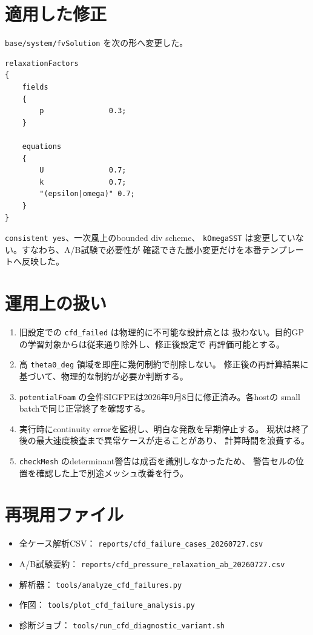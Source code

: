 \documentclass[a4paper,11pt]{article}
\begin{document}
\section{適用した修正}

\texttt{base/system/fvSolution} を次の形へ変更した。

\begin{verbatim}
relaxationFactors
{
    fields
    {
        p               0.3;
    }

    equations
    {
        U               0.7;
        k               0.7;
        "(epsilon|omega)" 0.7;
    }
}
\end{verbatim}

\texttt{consistent yes}、一次風上のbounded div scheme、
\texttt{kOmegaSST} は変更していない。すなわち、A/B試験で必要性が
確認できた最小変更だけを本番テンプレートへ反映した。

\section{運用上の扱い}

\begin{enumerate}[leftmargin=24pt]
  \item 旧設定での \texttt{cfd\_failed} は物理的に不可能な設計点とは
    扱わない。目的GPの学習対象からは従来通り除外し、修正後設定で
    再評価可能とする。
  \item 高 \texttt{theta0\_deg} 領域を即座に幾何制約で削除しない。
    修正後の再計算結果に基づいて、物理的な制約が必要か判断する。
  \item \texttt{potentialFoam} の全件SIGFPEは2026年9月8日に修正済み。各hostの
    small batchで同じ正常終了を確認する。
  \item 実行時にcontinuity errorを監視し、明白な発散を早期停止する。
    現状は終了後の最大速度検査まで異常ケースが走ることがあり、
    計算時間を浪費する。
  \item \texttt{checkMesh} のdeterminant警告は成否を識別しなかったため、
    警告セルの位置を確認した上で別途メッシュ改善を行う。
\end{enumerate}

\section{再現用ファイル}

\begin{itemize}[leftmargin=24pt]
  \item 全ケース解析CSV：
    \texttt{reports/cfd\_failure\_cases\_20260727.csv}
  \item A/B試験要約：
    \texttt{reports/cfd\_pressure\_relaxation\_ab\_20260727.csv}
  \item 解析器：
    \texttt{tools/analyze\_cfd\_failures.py}
  \item 作図：
    \texttt{tools/plot\_cfd\_failure\_analysis.py}
  \item 診断ジョブ：
    \texttt{tools/run\_cfd\_diagnostic\_variant.sh}
\end{itemize}
\end{document}
